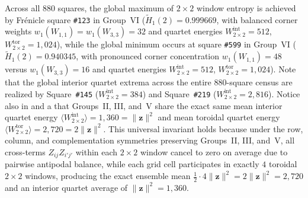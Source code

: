 Across all $880$ squares, the global maximum of $2\times 2$ window entropy is achieved by Fr\'enicle square \texttt{\#123} in Group~VI ($\widetilde{H}_1(2) = 0.999669$, with balanced corner weights $w_1(W_{1,1}) = w_1(W_{3,3}) = 32$ and quartet energies $W_{2\times 2}^{\mathrm{int}} = 512$, $W_{2\times 2}^{\mathrm{tor}} = 1{,}024$), while the global minimum occurs at square \texttt{\#599} in Group~VI ($\widetilde{H}_1(2) = 0.940345$, with pronounced corner concentration $w_1(W_{1,1}) = 48$ versus $w_1(W_{3,3}) = 16$ and quartet energies $W_{2\times 2}^{\mathrm{int}} = 512$, $W_{2\times 2}^{\mathrm{tor}} = 1{,}024$). Note that the global interior quartet extrema across the entire $880$-square census are realized by Square~\texttt{\#145} ($W_{2\times 2}^{\mathrm{int}} = 384$) and Square~\texttt{\#219} ($W_{2\times 2}^{\mathrm{int}} = 2{,}816$). Notice also in  and a that Groups~II, III, and~V share the exact same mean interior quartet energy $\langle W_{2\times 2}^{\mathrm{int}}\rangle = 1{,}360 = \|\mathbf{z}\|^2$ and mean toroidal quartet energy $\langle W_{2\times 2}^{\mathrm{tor}}\rangle = 2{,}720 = 2\|\mathbf{z}\|^2$. This universal invariant holds because under the row, column, and complementation symmetries preserving Groups~II, III, and~V, all cross-terms $Z_{ij} Z_{i'j'}$ within each $2\times 2$ window cancel to zero on average due to pairwise antipodal balance, while each grid cell participates in exactly $4$ toroidal $2\times 2$ windows, producing the exact ensemble mean $\frac{1}{2}\cdot 4\|\mathbf{z}\|^2 = 2\|\mathbf{z}\|^2 = 2{,}720$ and an interior quartet average of $\|\mathbf{z}\|^2 = 1{,}360$.
